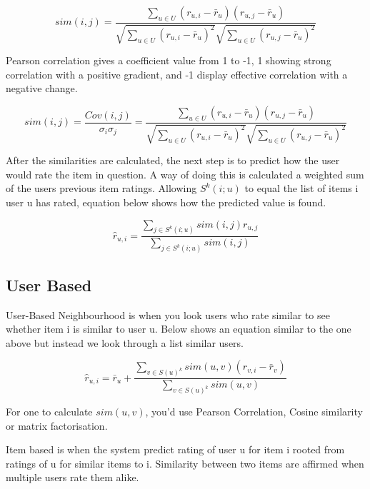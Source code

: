 \begin{equation}
	sim(i , j) = \frac{ \sum_{ u \in U } ( r _{ u, i } - \bar{r} _{u} ) ( r _{ u, j} - \bar{r} _{u} ) } { \sqrt{\sum_{ u \in U } ( r _{ u, i } - \bar{r} _{u} )^2} \sqrt{\sum_{ u \in U } ( r _{ u, j } - \bar{r} _{u} )^2}}
\end{equation}

Pearson correlation gives a coefficient value from 1 to -1, 1 showing strong correlation with a positive gradient, and -1 display effective correlation with a negative change.

\begin{equation}
	sim(i , j) = \frac{ Cov( i, j) }{ \sigma _{i} \sigma _{j} } = \frac{ \sum _{ u \in U} ( r _{ u, i } - \bar{r} _{u} ) ( r _{ u, j} - \bar{r} _{u} ) } { \sqrt{\sum_{ u \in U } ( r _{ u, i } - \bar{r} _{u} )^2} \sqrt{\sum_{ u \in U } ( r _{ u, j } - \bar{r} _{u} )^2}}
\end{equation}

After the similarities are calculated, the next step is to predict how the user would rate the item in question. A way of doing this is calculated a weighted sum of the users previous item ratings. Allowing $ S^{k}(i;u)$ to equal the list of items i user u has rated, equation below shows how the predicted value is found.

\begin{equation}
	\hat{r} _{u,i} = \frac{ \sum _{ j \in S^{k}(i;u)} sim(i , j) r _{u, j}}{\sum _{j \in S^{k}(i;u)} sim(i , j)}
\end{equation}




\subsection{User Based}

User-Based Neighbourhood is when you look users who rate similar to see whether item i is similar to user u. Below shows an equation similar to the one above but instead we look through a list similar users.

\begin{equation}
	\hat{r} _{u,i} = \bar{r}_{u} + \frac{ \sum _{v \in S(u)^{k}} sim(u ,v) ( r_{v, i} - \bar{r}_{v})}{\sum _{v \in S(u)^{k}} sim(u , v)}
\end{equation}

For one to calculate $sim(u , v)$, you'd use Pearson Correlation, Cosine similarity or matrix factorisation.

Item based is when the system predict rating of user u for item i rooted from ratings of u for similar items to i. Similarity between two items are affirmed when multiple users rate them alike.

